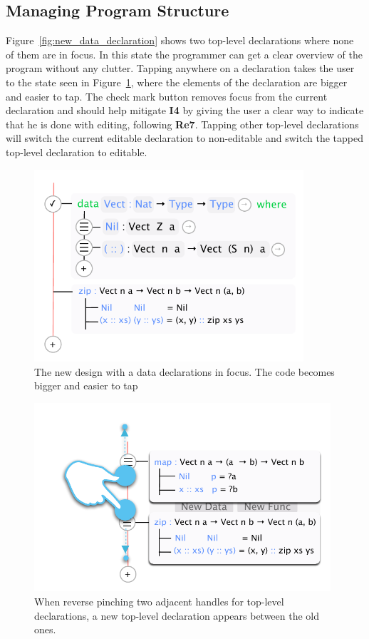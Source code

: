 \subsection{Managing Program Structure}
Figure~\ref{fig:new_data_declaration} shows two top-level declarations
where none of them are in focus. 
In this state the programmer can get a clear overview of the program without any clutter. 
Tapping anywhere on a declaration takes the user to the state seen in Figure~\ref{fig:new_design_data_in_focus}, where the elements of the declaration are bigger and easier to tap.
The check mark button removes focus from the current declaration and should help mitigate \textbf{I4} by giving the user a clear way to indicate that he is done with editing, following \textbf{Re7}.
Tapping other top-level declarations will switch the current editable declaration to non-editable and switch the tapped top-level declaration to editable.

\begin{figure}
	\centering
		\includegraphics[width=100mm]{diagrams/final_design_top_dec_in_focus.pdf}
	\caption{The new design with a data declarations in focus. The code becomes
	bigger and easier to tap}
\label{fig:new_design_data_in_focus}
\end{figure}

\begin{figure}
	\centering
		\includegraphics[width=110mm]{diagrams/new_function_reverse_pinch.pdf}
	\caption{When reverse pinching two adjacent handles for top-level
	declarations, a new top-level declaration appears between the old ones.}
\label{fig:new_function_reverse_pinch}
\end{figure}

